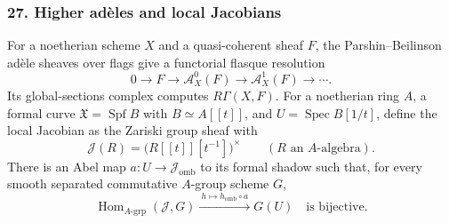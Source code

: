 \subsubsection{27. Higher ad\`eles and local Jacobians}
\begin{theorem}\label{B:subject27}
For a noetherian scheme $X$ and a quasi-coherent sheaf $F$, the Parshin--Beilinson ad\`ele sheaves over flags give a functorial flasque resolution
\[
 0\longrightarrow F\longrightarrow\mathcal A_X^0(F)
 \longrightarrow\mathcal A_X^1(F)\longrightarrow\cdots.
\]
Its global-sections complex computes $R\Gamma(X,F)$. For a noetherian ring $A$, a formal curve $\mathfrak X=\operatorname{Spf}B$ with $B\simeq A[[t]]$, and $U=\operatorname{Spec}B[1/t]$, define the local Jacobian as the Zariski group sheaf with
\[
 \mathcal J(R)=\bigl(R[[t]][t^{-1}]\bigr)^\times
 \qquad(R\text{ an }A\text{-algebra}).
\]
There is an Abel map $a:U\to\mathcal J_{\mathrm{omb}}$ to its formal shadow such that, for every smooth separated commutative $A$-group scheme $G$,
\[
 \operatorname{Hom}_{A\text{-}\mathrm{grp}}(\mathcal J,G)
 \xrightarrow{\ h\mapsto h_{\mathrm{omb}}\circ a\ }G(U)
 \quad\text{is bijective}.
\]
\end{theorem}
